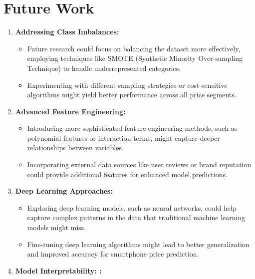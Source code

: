 \documentclass[12pt]{report}
\begin{document}
\section{Future Work}
\vspace{-0.5em}
\begin{enumerate}
	\setlength\itemsep{-1.05em}
	\item{\textbf{Addressing Class Imbalances: }}
	      \vspace{-1.65em}
	      \begin{itemize}
		      \setlength\itemsep{-1.5em}
		      \item Future research could focus on balancing the dataset more effectively, employing techniques like SMOTE (Synthetic Minority Over-sampling Technique) to handle underrepresented categories.
		      \item Experimenting with different sampling strategies or cost-sensitive algorithms might yield better performance across all price segments.
	      \end{itemize}
	\item{\textbf{Advanced Feature Engineering: }}
	      \vspace{-1.65em}
	      \begin{itemize}
		      \setlength\itemsep{-1.5em}
		      \item Introducing more sophisticated feature engineering methods, such as polynomial features or interaction terms, might capture deeper relationships between variables.
		      \item Incorporating external data sources like user reviews or brand reputation could provide additional features for enhanced model predictions.
	      \end{itemize}
	\item{\textbf{Deep Learning Approaches:	}}
	      \vspace{-1.65em}
	      \begin{itemize}
		      \setlength\itemsep{-1.5em}
		      \item Exploring deep learning models, such as neural networks, could help capture complex patterns in the data that traditional machine learning models might miss.
		      \item Fine-tuning deep learning algorithms might lead to better generalization and improved accuracy for smartphone price prediction.
	      \end{itemize}
	\item{\textbf{Model Interpretability:	:}}
	      \vspace{-1.65em}

\end{enumerate}
\end{document}
